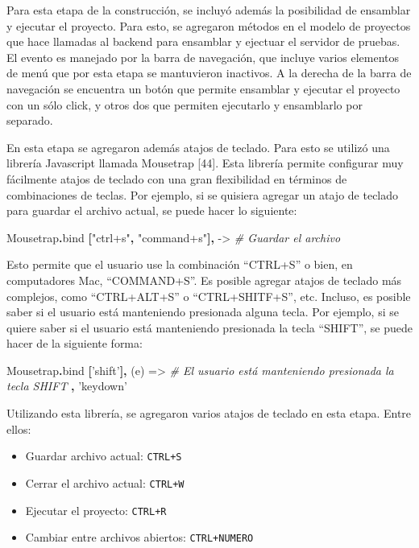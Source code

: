 \documentclass[12pt,spanish,letter]{report}
\newenvironment{Shaded}{}{}
\newcommand{\KeywordTok}[1]{\textcolor[rgb]{0.00,0.44,0.13}{\textbf{{#1}}}}
\newcommand{\StringTok}[1]{\textcolor[rgb]{0.25,0.44,0.63}{{#1}}}
\newcommand{\CommentTok}[1]{\textcolor[rgb]{0.38,0.63,0.69}{\textit{{#1}}}}
\newcommand{\FunctionTok}[1]{\textcolor[rgb]{0.02,0.16,0.49}{{#1}}}
\newcommand{\NormalTok}[1]{{#1}}
\begin{document}
Para esta etapa de la construcción, se incluyó además la posibilidad de
ensamblar y ejecutar el proyecto. Para esto, se agregaron métodos en el
modelo de proyectos que hace llamadas al backend para ensamblar y
ejectuar el servidor de pruebas. El evento es manejado por la barra de
navegación, que incluye varios elementos de menú que por esta etapa se
mantuvieron inactivos. A la derecha de la barra de navegación se
encuentra un botón que permite ensamblar y ejecutar el proyecto con un
sólo click, y otros dos que permiten ejecutarlo y ensamblarlo por
separado.

En esta etapa se agregaron además atajos de teclado. Para esto se
utilizó una librería Javascript llamada Mousetrap {[}44{]}. Esta
librería permite configurar muy fácilmente atajos de teclado con una
gran flexibilidad en términos de combinaciones de teclas. Por ejemplo,
si se quisiera agregar un atajo de teclado para guardar el archivo
actual, se puede hacer lo siguiente:

\begin{Shaded}
\begin{Highlighting}[]
\NormalTok{Mousetrap}\KeywordTok{.}\NormalTok{bind }\KeywordTok{[}\StringTok{"ctrl+s"}\KeywordTok{,} \StringTok{"command+s"}\KeywordTok{],} \FunctionTok{->}
  \CommentTok{# Guardar el archivo}
\end{Highlighting}
\end{Shaded}

Esto permite que el usuario use la combinación ``CTRL+S'' o bien, en
computadores Mac, ``COMMAND+S''. Es posible agregar atajos de teclado
más complejos, como ``CTRL+ALT+S'' o ``CTRL+SHITF+S'', etc. Incluso, es
posible saber si el usuario está manteniendo presionada alguna tecla.
Por ejemplo, si se quiere saber si el usuario está manteniendo
presionada la tecla ``SHIFT'', se puede hacer de la siguiente forma:

\begin{Shaded}
\begin{Highlighting}[]
\NormalTok{Mousetrap}\KeywordTok{.}\NormalTok{bind }\KeywordTok{[}\StringTok{'shift'}\KeywordTok{],} \FunctionTok{(e) =>}
      \CommentTok{# El usuario está manteniendo presionada la tecla SHIFT}
    \KeywordTok{,} \StringTok{'keydown'}
\end{Highlighting}
\end{Shaded}

Utilizando esta librería, se agregaron varios atajos de teclado en esta
etapa. Entre ellos:

\begin{itemize}
\item
  Guardar archivo actual: \texttt{CTRL+S}
\item
  Cerrar el archivo actual: \texttt{CTRL+W}
\item
  Ejecutar el proyecto: \texttt{CTRL+R}
\item
  Cambiar entre archivos abiertos: \texttt{CTRL+NUMERO}
\end{itemize}
\end{document}
